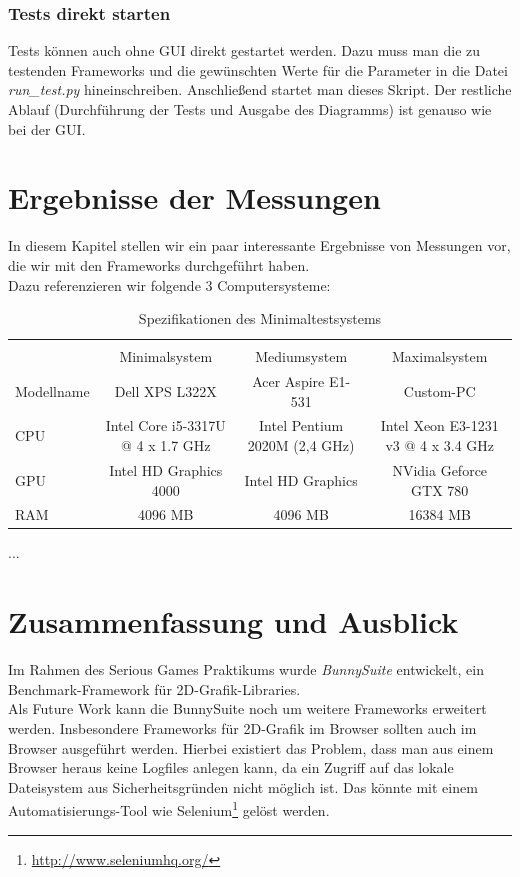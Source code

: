 \subsection{Tests direkt starten}
Tests können auch ohne GUI direkt gestartet werden. Dazu muss man die zu testenden Frameworks und die gewünschten Werte für die Parameter in die Datei \textit{run\_test.py} hineinschreiben. Anschließend startet man dieses Skript. Der restliche Ablauf (Durchführung der Tests und Ausgabe des Diagramms) ist genauso wie bei der GUI.

\chapter{Ergebnisse der Messungen}
\label{ch:results}
In diesem Kapitel stellen wir ein paar interessante Ergebnisse von Messungen vor, die wir mit den Frameworks durchgeführt haben.\\
Dazu referenzieren wir folgende 3 Computersysteme:

\begin{table}
    \begin{tabular}{ | l | c | c | c |}
    \hline \\
    			& Minimalsystem						& Mediumsystem					& Maximalsystem							\\ \hline
    Modellname 	& Dell XPS L322X 					& Acer Aspire E1-531			& Custom-PC 							\\ \hline
    CPU 		& Intel Core i5-3317U @ 4 x 1.7 GHz & Intel Pentium 2020M (2,4 GHz) & Intel Xeon E3-1231 v3 @ 4 x 3.4 GHz 	\\ \hline
    GPU 		& Intel HD Graphics 4000 			& Intel HD Graphics				& NVidia Geforce GTX 780				\\ \hline
    RAM 		& 4096 MB 							& 4096 MB						& 16384 MB 								\\ \hline
    \end{tabular}
    \caption{Spezifikationen des Minimaltestsystems}
   	\label{tab:allspecs}
\end{table}

...

\chapter{Zusammenfassung und Ausblick}
Im Rahmen des Serious Games Praktikums wurde \textit{BunnySuite} entwickelt, ein Benchmark-Framework für 2D-Grafik-Libraries. 
\\
Als Future Work kann die BunnySuite noch um weitere Frameworks erweitert werden. Insbesondere Frameworks für 2D-Grafik im Browser sollten auch im Browser ausgeführt werden. Hierbei existiert das Problem, dass man aus einem Browser heraus keine Logfiles anlegen kann, da ein Zugriff auf das lokale Dateisystem aus Sicherheitsgründen nicht möglich ist. Das könnte mit einem Automatisierungs-Tool wie Selenium\footnote{\url{http://www.seleniumhq.org/}} gelöst werden.
